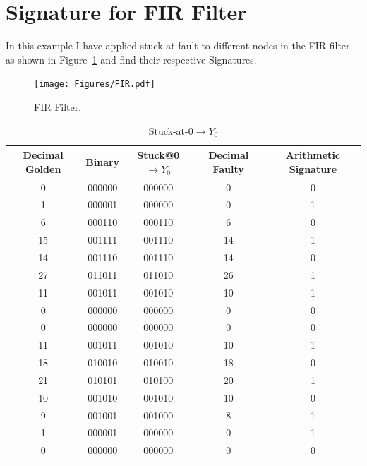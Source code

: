 \section{Signature for FIR Filter}


In this example I have applied stuck-at-fault to different nodes in the FIR filter as shown in Figure~\ref{fig:filter} and find their respective Signatures.



\begin{figure}[tb!]
 \centering
  \captionsetup{justification=centering}    
   \texttt{[image: Figures/FIR.pdf]}
   \caption{FIR Filter.}
\label{fig:filter}
\end{figure}





\begin{table}[tb!]
\center
\caption{Stuck-at-0$\rightarrow Y_0$}
\label{s@1-O0}
\begin{tabular}{|c | c| c | c| c |} 
 \hline
 \rowcolor{lightgray}
Decimal Golden & Binary & Stuck@0$\rightarrow Y_0$ & Decimal Faulty & Arithmetic Signature   \\ 
\hline
 
 
 0 & 000000 & 000000 & 0 & 0  \\
 \hline

 1 & 000001 & 000000 & 0 & 1 \\
 \hline
 
 6 & 000110 & 000110 & 6 & 0 \\
 \hline
 15 & 001111 & 001110 & 14 & 1 \\
 \hline
 14 & 001110 & 001110 & 14 & 0 \\
 \hline
 27 & 011011 & 011010 & 26 & 1 \\
 \hline
 11 & 001011 & 001010 & 10 & 1 \\
 \hline
 0 & 000000 & 000000 & 0 & 0 \\
 \hline
 0 & 000000 & 000000 & 0 & 0 \\
 \hline
 11 & 001011 & 001010 & 10 & 1 \\
 \hline
 18 & 010010 & 010010 & 18 & 0 \\
 \hline
 
 21 & 010101 & 010100 & 20 & 1 \\
 \hline
 10 & 001010 & 001010 & 10 & 0 \\
 \hline
 9 & 001001& 001000 & 8 & 1 \\
 \hline
 1 & 000001 & 000000 & 0 & 1 \\
 \hline
 0 & 000000 & 000000 & 0 & 0 \\
 \hline




 
 
\end{tabular}
\end{table}



















